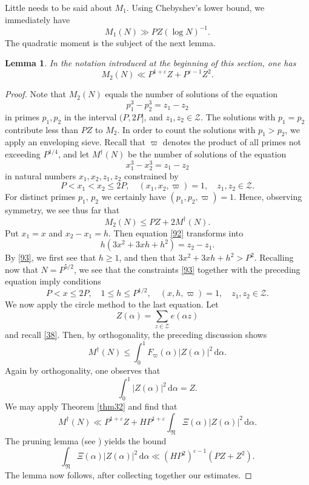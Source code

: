 \documentclass[reqno]{amsart}
\newcommand\dd{{\mathrm d}}
\newtheorem{lemma}[thm]{Lemma}
\numberwithin{equation}{section}
\begin{document}
Little needs to be said about $M_1$. Using Chebyshev's lower bound, we immediately have
\begin{equation}\label{90} M_1(N) \gg PZ (\log N)^{-1}. \end{equation}
The quadratic moment is the subject of the next lemma.

\begin{lemma}\label{L91} In the notation introduced at the beginning of this section, one has
$$ M_2(N) \ll P^{1+\varepsilon} Z + P^{\varepsilon-1} Z^2. $$
\end{lemma}

\begin{proof}
Note that $M_2(N)$ equals the number of solutions of the equation
$$ p_1^3 - p_2^3 = z_1 -z_2 $$
in primes $p_1,p_2$ in the interval $(P,2P]$, and $z_1,z_2\in\mathscr Z$. The solutions with $p_1=p_2$ contribute less than $PZ$ to $M_2$. In order to count the solutions with $p_1>p_2$, we apply an enveloping sieve. Recall that $\varpi$ denotes the product of all primes not exceeding $P^{1/4}$, and let $M^\dagger(N)$ be the number of solutions of the equation
\begin{equation}\label{92} x_1^3-x_2^3 = z_1-z_2 \end{equation}
in natural numbers $x_1,x_2,z_1,z_2$ constrained by
\begin{equation}\label{93} P<x_1<x_2\le 2P, \quad (x_1,x_2,\varpi)=1, \quad z_1,z_2\in\mathscr Z. \end{equation}
For distinct primes $p_1$, $p_2$ we certainly have $(p_1,p_2,\varpi)=1$. Hence, observing symmetry, we see thus far that
$$ M_2(N) \le PZ + 2M^\dagger(N). $$
Put $x_1=x$ and $x_2-x_1 = h$. Then equation \eqref{92} transforms into
$$ h(3x^2+3xh +h^2) = z_2-z_1. $$ 
By \eqref{93}, we first see that $h\ge 1$, and then that $3x^2+3xh+h^2 > P^2$.
Recalling now that $N=P^{5/2}$, we see that 
the constraints \eqref{93} together with the preceding equation imply conditions
$$ P<x\le 2P, \quad 1\le h\le P^{1/2}, \quad (x,h,\varpi)=1,\quad z_1,z_2\in\mathscr Z. $$
We now apply the circle method to the last equation. Let
$$ Z(\alpha) = \sum_{z\in\mathscr Z} e(\alpha z) $$
and recall \eqref{38}. Then, by orthogonality, the preceding discussion shows
$$  M^\dagger(N) \le \int_0^1 F_\varpi(\alpha)|Z(\alpha)|^2\,\dd\alpha. $$
Again by orthogonality, one observes that
$$ \int_0^1 |Z(\alpha)|^2\,\dd\alpha = Z. $$
We may apply Theorem \ref{thm32} and find that
$$ M^\dagger(N) \ll P^{1+\varepsilon}Z + HP^{1+\varepsilon} \int_{\mathfrak N} \Xi(\alpha) |Z(\alpha)|^2\,\dd\alpha. $$
The pruning lemma (see \cite[Lemma 2]{B89}) yields the bound
$$ \int_{\mathfrak N} \Xi(\alpha) |Z(\alpha)|^2\,\dd\alpha
\ll (HP^2)^{\varepsilon-1} (PZ +Z^2). $$
The lemma now follows, after collecting together our estimates.
\end{proof}
  
\end{document}
